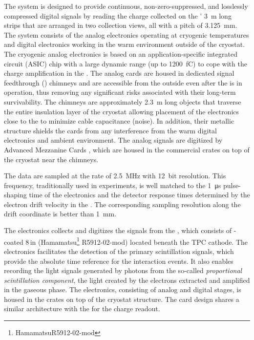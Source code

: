 The  system is designed to provide continuous, non-zero-suppressed, and losslessly compressed digital signals by reading the charge collected on the ' \SI{3}{m} long strips that are arranged in two collection views, all with a pitch of \SI{3.125}{mm}.%
The system consists of %
the  analog electronics operating at cryogenic temperatures and digital electronics working in the warm environment outside of the cryostat.  The cryogenic  analog electronics is based on an application-specific integrated circuit (ASIC) chip with a large dynamic range (up to \SI{1200}{fC}) to cope with the charge amplification in the . The analog  cards are housed in dedicated signal feedthrough () chimneys and are accessible from the outside even after the  is in operation, thus removing any significant risks associated with their long-term survivability. The  chimneys are approximately \SI{2.3}{m} long objects 
 that traverse the entire insulation layer of the cryostat allowing placement of the  electronics close to the  to minimize cable capacitance (noise).  In addition, their metallic structure shields the  cards 
from any interference from the warm digital electronics and ambient environment. The analog signals are digitized by Advanced Mezzanine Cards , which are housed in the commercial  crates on top of the cryostat near the  chimneys. 

The data are sampled at the rate of \SI{2.5}{MHz} with \SI{12}{bit} resolution.  
This frequency, traditionally used in \lartpc experiments, is well matched to the \SI{1}{\micro\second} pulse-shaping time of the  electronics and the detector response times determined by the electron drift velocity in the \lar. The corresponding sampling resolution along the drift coordinate is better than \SI{1}{\mm}. 

The  electronics collects and digitizes the signals from the , which consists of -coated \num{8}\,in  (Hamamatsu\footnote{Hamamatsu\texttrademark R5912-02-mod} R5912-02-mod) located beneath the TPC cathode. The  electronics %
facilitates the detection of the primary scintillation signals, which provide the absolute time reference for the interaction events. It %
also enables recording the light signals generated by photons from the so-called \textit{proportional scintillation component}, the light created by the electrons extracted and amplified in the gaseous phase. 
 The electronics, consisting of analog and digital stages,  is housed in the  crates on top of the cryostat structure. The card design shares a similar architecture with the  for the charge readout. 

